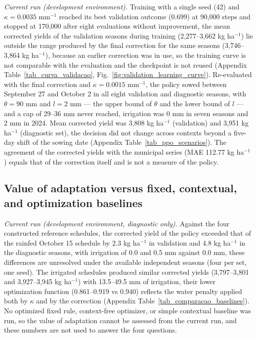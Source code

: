 \documentclass[times,final,authoryear]{elsarticle}
\begin{document}
\emph{Current run (development environment).} Training with a single seed (42) and $\kappa = 0.0035$ mm$^{-1}$ reached its best validation outcome (0.699) at 90,000 steps and stopped at 170,000 after eight evaluations without improvement, the mean corrected yields of the validation seasons during training (2,277--3,662 kg ha$^{-1}$) lie outside the range produced by the final correction for the same seasons (3,746--3,864 kg ha$^{-1}$), because an earlier correction was in use, so the training curve is not comparable with the evaluation and the checkpoint is not reused (Appendix Table~\ref{tab_curva_validacao}, Fig.~\ref{fig:validation_learning_curve}). Re-evaluated with the final correction and $\kappa = 0.0015$ mm$^{-1}$, the policy sowed between September 27 and October 2 in all eight validation and diagnostic seasons, with $\theta = 90$ mm and $l = 2$ mm --- the upper bound of $\theta$ and the lower bound of $l$ --- and a cap of 29--36 mm never reached, irrigation was 0 mm in seven seasons and 2 mm in 2024. Mean corrected yield was 3,808 kg ha$^{-1}$ (validation) and 3,951 kg ha$^{-1}$ (diagnostic set), the decision did not change across contexts beyond a five-day shift of the sowing date (Appendix Table~\ref{tab_ppo_scenarios}). The agreement of the corrected yields with the municipal series (MAE 112.77 kg ha$^{-1}$) equals that of the correction itself and is not a measure of the policy.

\subsection{Value of adaptation versus fixed, contextual, and optimization baselines}

\label{subres_value}



\emph{Current run (development environment, diagnostic only).} Against the four constructed reference schedules, the corrected yield of the policy exceeded that of the rainfed October 15 schedule by 2.3 kg ha$^{-1}$ in validation and 4.8 kg ha$^{-1}$ in the diagnostic seasons, with irrigation of 0.0 and 0.5 mm against 0.0 mm, these differences are unresolved under the available independent seasons (four per set, one seed). The irrigated schedules produced similar corrected yields (3,797--3,801 and 3,927--3,945 kg ha$^{-1}$) with 13.5--49.5 mm of irrigation, their lower optimization function (0.861--0.919 vs 0.940) reflects the water penalty applied both by $\kappa$ and by the correction (Appendix Table~\ref{tab_comparacao_baselines}). No optimized fixed rule, context-free optimizer, or simple contextual baseline was run, so the value of adaptation cannot be assessed from the current run, and these numbers are not used to answer the four questions.
\end{document}
